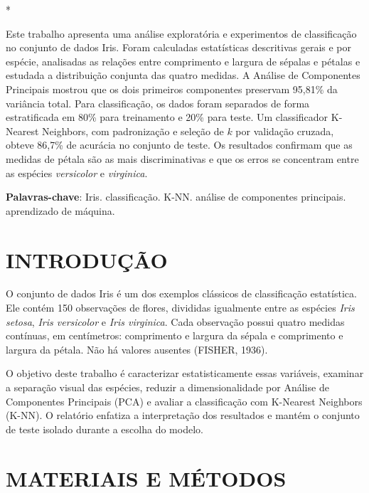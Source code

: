 \documentclass[12pt, a4paper, twoside, chapter=TITLE, subsection=TITLE,
section=TITLE, subsubsection=TITLE, english, brazil]{abntex2}
\begin{document}
\pretextual
\imprimircapa
\imprimirfolhaderosto[]*
\makeatother\cleardoublepage

\begin{resumo}[Resumo]
Este trabalho apresenta uma análise exploratória e experimentos de classificação no conjunto de dados Iris. Foram calculadas estatísticas descritivas gerais e por espécie, analisadas as relações entre comprimento e largura de sépalas e pétalas e estudada a distribuição conjunta das quatro medidas. A Análise de Componentes Principais mostrou que os dois primeiros componentes preservam 95,81\% da variância total. Para classificação, os dados foram separados de forma estratificada em 80\% para treinamento e 20\% para teste. Um classificador K-Nearest Neighbors, com padronização e seleção de $k$ por validação cruzada, obteve 86,7\% de acurácia no conjunto de teste. Os resultados confirmam que as medidas de pétala são as mais discriminativas e que os erros se concentram entre as espécies \textit{versicolor} e \textit{virginica}.

\vspace{\onelineskip}
\noindent
\textbf{Palavras-chave}: Iris. classificação. K-NN. análise de componentes principais. aprendizado de máquina.
\end{resumo}

\tableofcontents*
\cleardoublepage

\textual

\chapter{INTRODUÇÃO}
O conjunto de dados Iris é um dos exemplos clássicos de classificação estatística. Ele contém 150 observações de flores, divididas igualmente entre as espécies \textit{Iris setosa}, \textit{Iris versicolor} e \textit{Iris virginica}. Cada observação possui quatro medidas contínuas, em centímetros: comprimento e largura da sépala e comprimento e largura da pétala. Não há valores ausentes (FISHER, 1936).

O objetivo deste trabalho é caracterizar estatisticamente essas variáveis, examinar a separação visual das espécies, reduzir a dimensionalidade por Análise de Componentes Principais (PCA) e avaliar a classificação com K-Nearest Neighbors (K-NN). O relatório enfatiza a interpretação dos resultados e mantém o conjunto de teste isolado durante a escolha do modelo.

\chapter{MATERIAIS E MÉTODOS}
\end{document}
